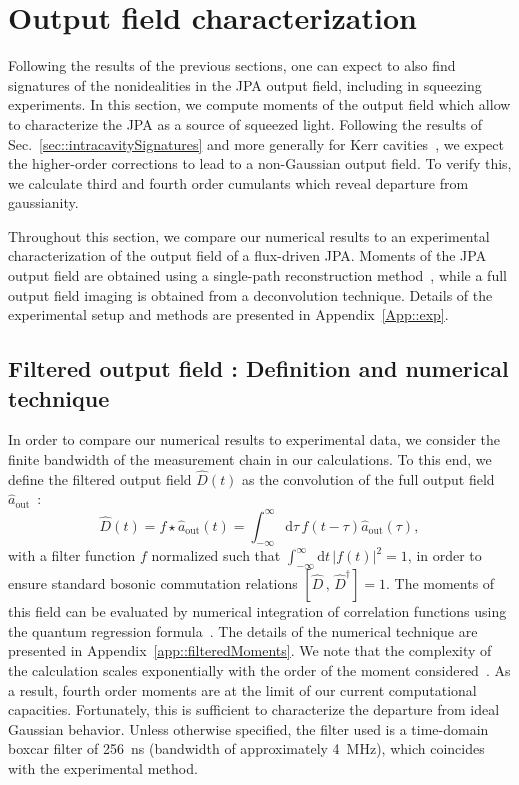 \documentclass[pra,twocolumn,superscriptaddress]{revtex4-1}
\newcommand{\aout}[0]{\hat{a}_{\mathrm{out}}}
\newcommand{\abs}[1]{\left|#1\right|}
\newcommand{\drm}[0]{\mathrm{d}}
\begin{document}
\section{Output field characterization}
\label{sec::filteredOutput}
Following the results of the previous sections, one can expect to also find signatures of the nonidealities in the JPA output field, including in squeezing experiments. In this section, we compute moments of the output field which allow to characterize the JPA as a source of squeezed light. 
% 
Following the results of Sec.~\ref{sec::intracavitySignatures} and more generally for Kerr cavities~\cite{dodonov2003theory,Kirchmair:2013pi}, we expect the higher-order corrections to lead to a non-Gaussian output field. 
% 
To verify this, we calculate third and fourth order cumulants which reveal departure from gaussianity. 

Throughout this section, we compare our numerical results to an experimental characterization of the output field of a flux-driven JPA. Moments of the JPA output field are obtained using a single-path reconstruction method~\cite{Eichler_PRL_2011}, while a full output field imaging is obtained from a deconvolution technique. Details of the experimental setup and methods are presented in Appendix~\ref{App::exp}.


\subsection{Filtered output field : Definition and numerical technique}
In order to compare our numerical results to experimental data, we consider the finite bandwidth of the measurement chain in our calculations. 
To this end, we define the filtered output field $\hat D(t)$ as the convolution of the full output field $\aout$~\cite{Silva:2010mi}:
\begin{equation}
	\hat D(t) = f \star \aout (t)  
	= \int_{-\infty}^{\infty} \mathrm{d}\tau \, f(t-\tau) \aout(\tau),
\end{equation}
% 
with a filter function $f$
normalized such that $\int_{-\infty}^\infty \! \drm t \, \abs{f(t)}^2  =1$, in order to ensure standard bosonic commutation relations $[\hat D \,, \, \hat D^\dag] =1$.
% 
The moments of this field can be evaluated by numerical integration of correlation functions using the quantum regression formula~\cite{Gardiner:2004fk}. The details of the numerical technique are presented in Appendix~\ref{app::filteredMoments}. We note that the complexity of the calculation scales exponentially with the order of the moment considered~\cite{Silva:2010mi}. As a result, fourth order moments are at the limit of our current computational capacities. Fortunately, this is sufficient to characterize the departure from ideal Gaussian behavior.
% 
Unless otherwise specified, the filter used is a time-domain boxcar filter of 256~ns (bandwidth of approximately 4~MHz), which coincides with the experimental method.
\end{document}
